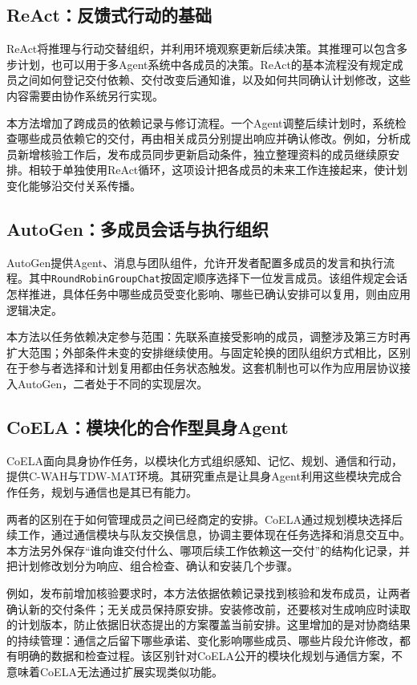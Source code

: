 \subsection{ReAct：反馈式行动的基础}

ReAct将推理与行动交替组织，并利用环境观察更新后续决策\cite{react}。其推理可以包含多步计划，也可以用于多Agent系统中各成员的决策。ReAct的基本流程没有规定成员之间如何登记交付依赖、交付改变后通知谁，以及如何共同确认计划修改，这些内容需要由协作系统另行实现。

本方法增加了跨成员的依赖记录与修订流程。一个Agent调整后续计划时，系统检查哪些成员依赖它的交付，再由相关成员分别提出响应并确认修改。例如，分析成员新增核验工作后，发布成员同步更新启动条件，独立整理资料的成员继续原安排。相较于单独使用ReAct循环，这项设计把各成员的未来工作连接起来，使计划变化能够沿交付关系传播。

\subsection{AutoGen：多成员会话与执行组织}

AutoGen提供Agent、消息与团队组件，允许开发者配置多成员的发言和执行流程\cite{autogen}。其中\texttt{RoundRobinGroupChat}按固定顺序选择下一位发言成员。该组件规定会话怎样推进，具体任务中哪些成员受变化影响、哪些已确认安排可以复用，则由应用逻辑决定。

本方法以任务依赖决定参与范围：先联系直接受影响的成员，调整涉及第三方时再扩大范围；外部条件未变的安排继续使用。与固定轮换的团队组织方式相比，区别在于参与者选择和计划复用都由任务状态触发。这套机制也可以作为应用层协议接入AutoGen，二者处于不同的实现层次。

\subsection{CoELA：模块化的合作型具身Agent}

CoELA面向具身协作任务，以模块化方式组织感知、记忆、规划、通信和行动，提供C-WAH与TDW-MAT环境\cite{coela}。其研究重点是让具身Agent利用这些模块完成合作任务，规划与通信也是其已有能力。

两者的区别在于如何管理成员之间已经商定的安排。CoELA通过规划模块选择后续工作，通过通信模块与队友交换信息，协调主要体现在任务选择和消息交互中。本方法另外保存“谁向谁交付什么、哪项后续工作依赖这一交付”的结构化记录，并把计划修改划分为响应、组合检查、确认和安装几个步骤。

例如，发布前增加核验要求时，本方法依据依赖记录找到核验和发布成员，让两者确认新的交付条件；无关成员保持原安排。安装修改前，还要核对生成响应时读取的计划版本，防止依据旧状态提出的方案覆盖当前安排。这里增加的是对协商结果的持续管理：通信之后留下哪些承诺、变化影响哪些成员、哪些片段允许修改，都有明确的数据和检查过程。该区别针对CoELA公开的模块化规划与通信方案，不意味着CoELA无法通过扩展实现类似功能。

